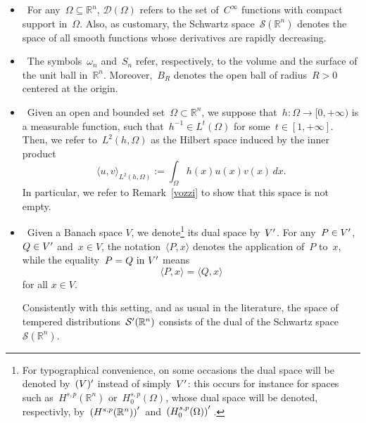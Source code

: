 \documentclass[11pt,hyp,]{nyjm}
\numberwithin{equation}{section}
\newcommand{\R}{\mathbb{R}}
\theoremstyle{remark}
\begin{document}
\begin{itemize}
\item~For any~$\Omega\subseteq\R^n$, $\mathcal{D}(\Omega)$ refers to the set of~$C^{\infty}$ functions with compact support in~$\Omega$. Also, as customary, the Schwartz space~$\mathcal{S}(\R^n)$ denotes the space of all smooth functions whose derivatives are rapidly decreasing.
\item~The symbols~$\omega_n$ and~$ S_n$ refer, respectively, to the volume and the surface of the unit ball in~$\R^n$. Moreover,~$B_R$ denotes the open ball of radius~$R>0$ centered at the origin.
\item~Given an open and bounded set~$\Omega\subset\R^n$, we suppose that~$h:\Omega\to[0,+\infty)$ is a measurable function, such that~$h^{-1} \in L^t(\Omega)$ for some~$t \in[1,+\infty]$. Then, we refer to~$L^2(h, \Omega)$ as the Hilbert space induced by the inner product
           \begin{equation*}
           	\langle u,v \rangle_{L^2(h, \Omega)} := \int_{\Omega} h(x) u (x)v(x) \, dx.
           \end{equation*}
In particular, we refer to Remark~\ref{vozzi} to show that this space is not empty.
\item~Given a Banach space $V$, we denote\footnote{ For typographical convenience, on some occasions the dual space will be denoted by~$(V)\rq{}$ instead of simply~$V\rq{}$: this occurs for instance for spaces such as~$H^{s,p}(\R^n)$ or~$ H^{s,p}_0(\Omega) $, whose dual space will be denoted, respectivly, by~$\left(H^{s,p}(\R^n)\right)\rq{}$ and~$ \left(  H^{s,p}_0(\Omega) \right) \rq{}$.} its dual space by~$V\rq{}$.
For any~$P \in V\rq{}$,~$Q \in V\rq{}$ and~$x \in V$, the notation~$\langle P, x \rangle $ \label{miwfh:302rtojgFWSa}
denotes the application of~$P$ to~$x$, while the equality~${P=Q \mbox{ in } V\rq{}}$ means
\[ \langle P, x \rangle = \langle Q, x \rangle \] for all $x\in V$.

Consistently with this setting,
and as usual in the literature, the space of tempered distributions~$ \mathcal{S}\rq{}(\R^n)$
consists of the dual of  the Schwartz space~$\mathcal{S}(\R^n)$.



\end{itemize}
\end{document}
